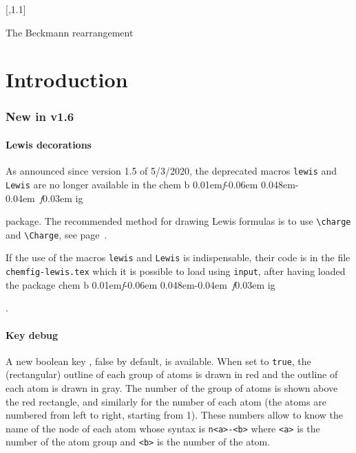 \documentclass[10pt]{article}
\makeatletter
\DeclareRobustCommand\CF{%
	\textsf{%
		chem%
		\if\string b\detokenize\expandafter{\f@series}%
			\lower0.01em\hbox{\itshape f}\kern-0.06em
		\else
			\lower0.048em\hbox{\kern-0.04em \itshape f}\kern0.03em
		\fi ig%
		}%
		\xspace
}
\newcommand*\CFkey[1]{{\color{teal}\texttt{\detokenize{#1}}}}
\makeatother
\begin{document}
\begin{titlepage}
{		  \chemleft[{\subscheme[90]{%
		    \chemfig{R'-\chemabove{N}{\scriptstyle\oplus}~C-R}
		    \arrow{<->}[,0.75]
		    \chemfig{R'-\charge{90=\:}{N}=@{a1}\chemabove{C}{\scriptstyle\oplus}-R}}}\chemright]
		  \arrow{<=>[\chemfig{H_2@{a0}\charge{0=\:,90=\:}{O}}]}[,1.1]
		  \arrow
		\schemestop\hss}\hfill\null
	\begin{center}
		\sffamily\small The Beckmann rearrangement%
	\end{center}
\end{titlepage}
\parindent0pt\pagestyle{plain}
\tableofcontents
\parskip\medskipamount
\newpage

\part{Introduction}
\section{New in v1.6}
\subsection{Lewis decorations}
As announced since version 1.5 of 5/3/2020, the deprecated macros \verb|lewis| and \verb|Lewis| are no longer available in the \CF package. The recommended method for drawing Lewis formulas is to use \verb|\charge| and \verb|\Charge|, see page~\pageref{charge}.

If the use of the macros \verb|lewis| and \verb|Lewis| is indispensable, their code is in the file \verb|chemfig-lewis.tex| which it is possible to load using \verb|input|, after having loaded the package \CF.

\subsection{Key debug}
A new boolean key \CFkey{debug}, false by default, is available. When set to \verb|true|, the (rectangular) outline of each group of atoms is drawn in red and the outline of each atom is drawn in gray. The number of the group of atoms is shown above the red rectangle, and similarly for the number of each atom (the atoms are numbered from left to right, starting from 1). These numbers allow to know the name of the node of each atom whose syntax is \verb|n<a>-<b>| where \verb|<a>| is the number of the atom group and \verb|<b>| is the number of the atom.
\end{document}
